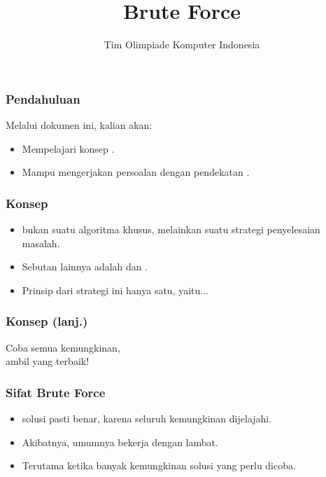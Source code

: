 

\title{Brute Force}
\author{Tim Olimpiade Komputer Indonesia}
\date{}



\begin{frame}
\titlepage
\end{frame}

\begin{frame}
\frametitle{Pendahuluan}
Melalui dokumen ini, kalian akan:
\begin{itemize}
  \item Mempelajari konsep \fBruteForce.
  \item Mampu mengerjakan persoalan dengan pendekatan \fBruteForce.
\end{itemize}
\end{frame}

\begin{frame}
\frametitle{Konsep}
\begin{itemize}
  \item \fBruteForce bukan suatu algoritma khusus, melainkan suatu strategi penyelesaian masalah.
  \item Sebutan lainnya adalah \fCompleteSearch dan \fExhaustiveSearch.
  \item Prinsip dari strategi ini hanya satu, yaitu...
\end{itemize}
\end{frame}

\begin{frame}
\frametitle{Konsep (lanj.)}
\begin{center}
  \huge Coba semua kemungkinan,\\ambil yang terbaik!
\end{center}
\end{frame}

\begin{frame}
\frametitle{Sifat Brute Force}
\begin{itemize}
  \item \fBruteForce {} solusi pasti benar, karena seluruh kemungkinan dijelajahi.
  \item Akibatnya, umumnya \fBruteForce bekerja dengan lambat.
  \item Terutama ketika banyak kemungkinan solusi yang perlu dicoba.
\end{itemize}
\end{frame}

